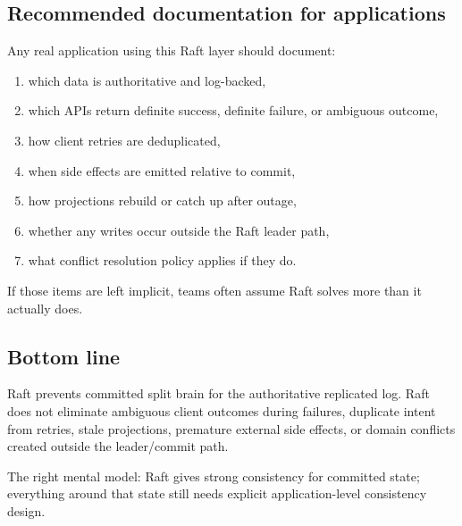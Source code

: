 \subsection{Recommended documentation for applications}

Any real application using this Raft layer should document:

\begin{enumerate}
\item which data is authoritative and log-backed,
\item which APIs return definite success, definite failure, or ambiguous
outcome,
\item how client retries are deduplicated,
\item when side effects are emitted relative to commit,
\item how projections rebuild or catch up after outage,
\item whether any writes occur outside the Raft leader path,
\item what conflict resolution policy applies if they do.
\end{enumerate}

If those items are left implicit, teams often assume Raft solves more than
it actually does.

\subsection{Bottom line}

Raft prevents committed split brain for the authoritative replicated log.
Raft does not eliminate ambiguous client outcomes during failures,
duplicate intent from retries, stale projections, premature external side
effects, or domain conflicts created outside the leader/commit path.

The right mental model: Raft gives strong consistency for committed state;
everything around that state still needs explicit application-level
consistency design.
